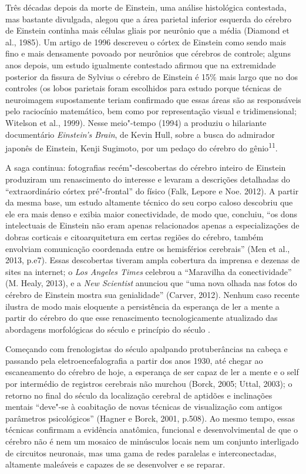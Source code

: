Três décadas depois da morte de Einstein, uma análise histológica
contestada, mas bastante divulgada, alegou que a área parietal inferior
esquerda do cérebro de Einstein continha mais células gliais por
neurônio que a média (Diamond et al., 1985). Um artigo de 1996 descreveu
o córtex de Einstein como sendo mais fino e mais densamente povoado por
neurônios que cérebros de controle; alguns anos depois, um estudo
igualmente contestado afirmou que na extremidade posterior da fissura de
Sylvius o cérebro de Einstein é 15\% mais largo que no dos controles (os
lobos parietais foram escolhidos para estudo porque técnicas de
neuroimagem supostamente teriam confirmado que essas áreas são as
responsáveis pelo raciocínio matemático, bem como por representação
visual e tridimensional; Witelson et al., 1999). Nesse meio"-tempo (1994)
a  produziu o hilariante documentário \emph{Einstein's Brain}, de
Kevin Hull, sobre a busca do admirador japonês de Einstein, Kenji
Sugimoto, por um pedaço do cérebro do gênio\textsuperscript{11}.

A saga continua: fotografias recém"-descobertas do cérebro inteiro de
Einstein produziram um renascimento do interesse e levaram a descrições
detalhadas do ``extraordinário córtex pré"-frontal'' do físico (Falk,
Lepore e Noe. 2012). A partir da mesma base, um estudo altamente técnico
do seu corpo caloso descobriu que ele era mais denso e exibia maior
conectividade, de modo que, concluiu, ``os dons intelectuais de Einstein
não eram apenas relacionados apenas a especializações de dobras
corticais e citoarquitetura em certas regiões do cérebro, também
envolviam comunicação coordenada entre os hemisférios cerebrais'' (Men
et al., 2013, p.e7). Essas descobertas tiveram ampla cobertura da
imprensa e dezenas de sites na internet; o \emph{Los Angeles Times}
celebrou a ``Maravilha da conectividade'' (M. Healy, 2013), e a
\emph{New Scientist} anunciou que ``uma nova olhada nas fotos do cérebro
de Einstein mostra sua genialidade'' (Carver, 2012). Nenhum caso recente
ilustra de modo mais eloquente a persistência da esperança de ler a
mente a partir do cérebro do que esse renascimento tecnologicamente
atualizado das abordagens morfológicas do século  e princípio do
século .

Começando com frenologistas do século  apalpando protuberâncias na
cabeça e passando pela eletroencefalografia a partir dos anos 1930, até
chegar ao escaneamento do cérebro de hoje, a esperança de ser capaz de
ler a mente e o self por intermédio de registros cerebrais não murchou
(Borck, 2005; Uttal, 2003); o retorno no final do século  da
localização cerebral de aptidões e inclinações mentais ``deve"-se à
coabitação de novas técnicas de visualização com antigos parâmetros
psicológicos'' (Hagner e Borck, 2001, p.508). Ao mesmo tempo, essas
técnicas confirmam a evidência anatômica, funcional e desenvolvimental
de que o cérebro não é nem um mosaico de minúsculos locais nem um
conjunto interligado de circuitos neuronais, mas uma gama de redes
paralelas e interconectadas, altamente maleáveis e capazes de se
desenvolver e se reparar.

